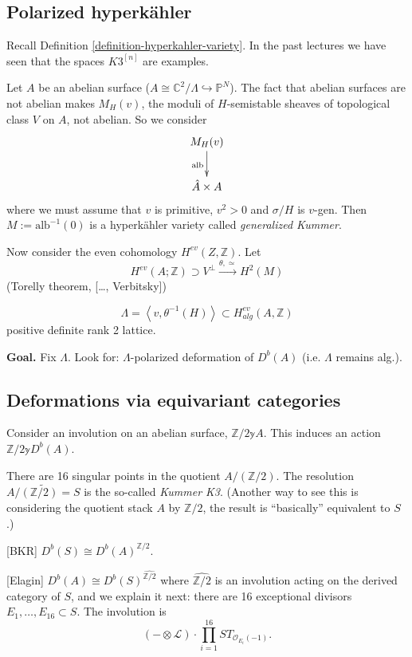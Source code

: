 \subsection{Polarized hyperkähler}
\label{subsection-polarized-hyperkahler}

Recall Definition \ref{definition-hyperkahler-variety}. In the past lectures we
have seen that the spaces $K3^{[n]}$ are examples.

Let $A$ be an abelian surface 
($A \cong \mathbb{C}^2/\Lambda \hookrightarrow\mathbb{P}^N$). 
The fact that abelian surfaces are not abelian makes $M_H(v)$, the moduli of
$H$-semistable sheaves of topological class $V$ on $A$, not abelian. So we
consider
$$
\xymatrix{
M_H(v)\ar[d]_{\text{alb}}\\
\hat{A}\times A
}
$$
where we must assume that $v$ is primitive, $v^2>0$ and $\sigma/H$ is $v$-gen.
Then $M:=\text{alb}^{-1}(0)$ is a hyperkähler variety called {\it generalized
Kummer}.

Now consider the even cohomology $H^{ev}(Z,\mathbb{Z})$. Let
$$
H^{ev}(A;\mathbb{Z})\supset V^\perp \xrightarrow{\theta,\simeq }H^{2}(M)
$$
(Torelly theorem, […, Verbitsky])

\begin{remark}
\label{remark-positive-definte-rank-2-lattice}
$$
\Lambda=\left<v,\theta^{-1}(H)\right>\subset H^{ev}_{alg}(A,\mathbb{Z})
$$
positive definite rank 2 lattice.
\end{remark}

{\bf Goal.} Fix $\Lambda$. Look for: $\Lambda$-polarized deformation of $D^b(A)$
(i.e. $\Lambda$ remains alg.).

\subsection{Deformations via equivariant categories}
\label{subsection-deformations-via-equivariant-categories}

Consider an involution on an abelian surface, $\mathbb{Z}/2 \mathbb{y} A$. 
This induces an action $ \mathbb{Z}/2 \mathbb{y}D^b(A)$.

There are 16 singular points in the quotient $A/(\mathbb{Z}/2)$. The resolution
$\widetilde{A/(\mathbb{Z}/2)=S}$ is the so-called {\it Kummer K3}. (Another way
to see this is considering the quotient stack $A$ by  $\mathbb{Z}/2$, the result
is ``basically'' equivalent to $S$.)

[BKR] $D^b(S)\cong D^b(A)^{\mathbb{Z}/2}$.

[Elagin] $D^b(A) \cong D^b(S)^{\widehat{\mathbb{Z}/2}}$ where
$\widehat{\mathbb{Z}/2}$ is an involution acting on the derived category of $S$,
and we explain it next: 
there are 16 exceptional divisors $E_1,\ldots,E_{16}\subset S$. The involution 
is
$$
(- \otimes \mathcal{L})\cdot \prod_{i=1}^{16}ST_{\mathcal{O}_{E_i}(-1)}.
$$

